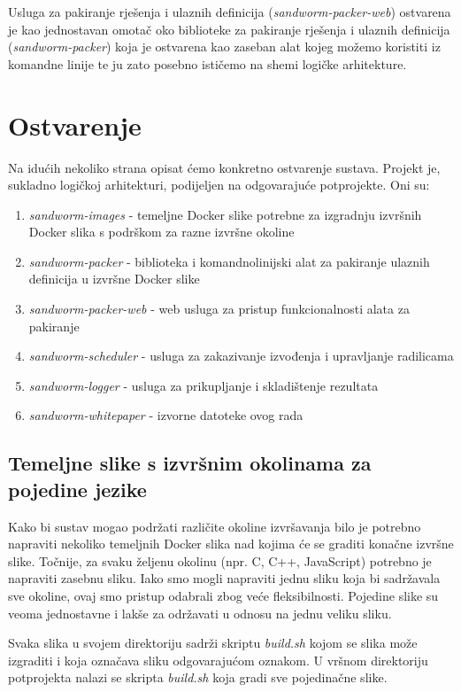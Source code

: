 \documentclass[times, utf8, zavrsni]{fer}
\begin{document}
Usluga za pakiranje rješenja i ulaznih definicija ({\textit{sandworm-packer-web}}) ostvarena je kao jednostavan omotač oko biblioteke za pakiranje rješenja i ulaznih definicija ({\textit{sandworm-packer}}) koja je ostvarena kao zaseban alat kojeg možemo koristiti iz komandne linije te ju zato posebno ističemo na shemi logičke arhitekture.


\section{Ostvarenje}

Na idućih nekoliko strana opisat ćemo konkretno ostvarenje sustava. Projekt je, sukladno logičkoj arhitekturi, podijeljen na odgovarajuće potprojekte. Oni su:

\begin{enumerate}
\item {\textit{sandworm-images}} - temeljne Docker slike potrebne za izgradnju izvršnih Docker slika s podrškom za razne izvršne okoline
\item {\textit{sandworm-packer}} - biblioteka i komandnolinijski alat za pakiranje ulaznih definicija u izvršne Docker slike
\item {\textit{sandworm-packer-web}} - web usluga za pristup funkcionalnosti alata za pakiranje
\item {\textit{sandworm-scheduler}} - usluga za zakazivanje izvođenja i upravljanje radilicama
\item {\textit{sandworm-logger}} - usluga za prikupljanje i skladištenje rezultata
\item {\textit{sandworm-whitepaper}} - izvorne datoteke ovog rada
\end{enumerate}


\subsection{Temeljne slike s izvršnim okolinama za pojedine jezike}

Kako bi sustav mogao podržati različite okoline izvršavanja bilo je potrebno napraviti nekoliko temeljnih Docker slika nad kojima će se graditi konačne izvršne slike. Točnije, za svaku željenu okolinu (npr. C, C++, JavaScript) potrebno je napraviti zasebnu sliku. Iako smo mogli napraviti jednu sliku koja bi sadržavala sve okoline, ovaj smo pristup odabrali zbog veće fleksibilnosti. Pojedine slike su veoma jednostavne i lakše za održavati u odnosu na jednu veliku sliku.

Svaka slika u svojem direktoriju sadrži skriptu {\textit{build.sh}} kojom se slika može izgraditi i koja označava sliku odgovarajućom oznakom. U vršnom direktoriju potprojekta nalazi se skripta {\textit{build.sh}} koja gradi sve pojedinačne slike.
\end{document}
